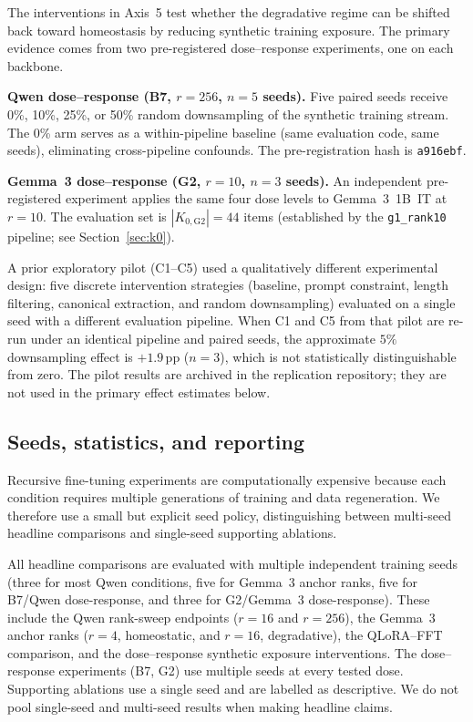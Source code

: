 \documentclass[a4paper,fleqn]{cas-dc}
\newif\ifshowchanges
\newcommand{\rev}[1]{\ifshowchanges{\color{blue}#1}\else{#1}\fi}
\begin{document}
\rev{The interventions in Axis~5 test whether the degradative regime can be shifted
back toward homeostasis by reducing synthetic training exposure. The primary
evidence comes from two pre-registered dose--response experiments, one on each
backbone.

\textbf{Qwen dose--response (B7, $r=256$, $n=5$ seeds).}
Five paired seeds receive 0\%, 10\%, 25\%, or 50\% random downsampling of the
synthetic training stream. The 0\% arm serves as a within-pipeline baseline
(same evaluation code, same seeds), eliminating cross-pipeline confounds. The
pre-registration hash is \texttt{a916ebf}.

\textbf{Gemma~3 dose--response (G2, $r=10$, $n=3$ seeds).}
An independent pre-registered experiment applies the same four dose levels to
Gemma~3~1B~IT at $r=10$. The evaluation set is $|K_{0,\mathrm{G2}}|=44$ items
(established by the \texttt{g1\_rank10} pipeline; see Section~\ref{sec:k0}).

}
\rev{A prior exploratory pilot (C1--C5) used a qualitatively different
experimental design: five discrete intervention strategies (baseline, prompt
constraint, length filtering, canonical extraction, and random downsampling)
evaluated on a single seed with a different evaluation pipeline. When C1 and C5
from that pilot are re-run under an identical pipeline and paired seeds, the
approximate $5\%$ downsampling effect is $+1.9$\,pp ($n=3$), which is not
statistically distinguishable from zero. The pilot results are archived in the
replication repository; they are not used in the primary effect estimates below.}

\subsection{Seeds, statistics, and reporting}\label{sec:statistics}

Recursive fine-tuning experiments are computationally expensive because each
condition requires multiple generations of training and data regeneration. We
therefore use a small but explicit seed policy, distinguishing between
multi-seed headline comparisons and single-seed supporting ablations.

All headline comparisons are evaluated with multiple independent training seeds
\rev{(three for most Qwen conditions, five for Gemma~3 anchor ranks, five for B7/Qwen dose-response, and three for G2/Gemma~3 dose-response)}. These
include the Qwen rank-sweep endpoints ($r=16$ and $r=256$), the Gemma~3 anchor
\rev{ranks ($r=4$, homeostatic, and $r=16$, degradative), the QLoRA--FFT comparison, and the dose--response synthetic}
exposure interventions. \rev{The dose--response experiments (B7, G2) use multiple seeds at
every tested dose. Supporting ablations use a single seed and are
labelled as descriptive.} We do not pool
single-seed and multi-seed results when making headline claims.
\end{document}
